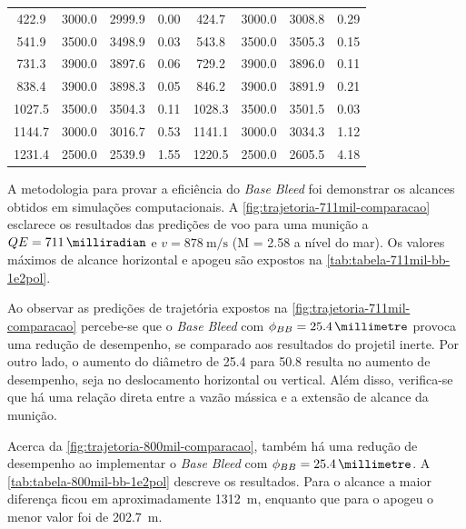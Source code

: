 \begin{table}[ht]
{\begin{tabular}{c|c|c|c|c|c|c|c}
        \num{422,9} & \num{3000,0} & \num{2999,9} & \num{0,00} & \num{424,7} & \num{3000,0} & \num{3008,8} & \num{0,29} \\
        \num{541,9} & \num{3500,0} & \num{3498,9} & \num{0,03} & \num{543,8} & \num{3500,0} & \num{3505,3} & \num{0,15} \\
        \num{731,3} & \num{3900,0} & \num{3897,6} & \num{0,06} & \num{729,2} & \num{3900,0} & \num{3896,0} & \num{0,11} \\
        \num{838,4} & \num{3900,0} & \num{3898,3} & \num{0,05} & \num{846,2} & \num{3900,0} & \num{3891,9} & \num{0,21} \\
        \num{1027,5} & \num{3500,0} & \num{3504,3} & \num{0,11} & \num{1028,3} & \num{3500,0} & \num{3501,5} & \num{0,03} \\
        \num{1144,7} & \num{3000,0} & \num{3016,7} & \num{0,53} & \num{1141,1} & \num{3000,0} & \num{3034,3} & \num{1,12} \\
        \num{1231,4} & \num{2500,0} & \num{2539,9} & \num{1,55} & \num{1220,5} & \num{2500,0} & \num{2605,5} & \num{4,18} \\ 
        \hline
    \end{tabular}%
    }
    \label{tab:tabela-validacao-PRODAS-e-tabela-de-tiro-M107}
\end{table}

A metodologia para provar a eficiência do \textit{Base Bleed} foi demonstrar os alcances obtidos em simulações computacionais. A \autoref{fig:trajetoria-711mil-comparacao} esclarece os resultados das predições de voo para uma munição a \(QE = \qty{711}{\milliradian}\) e \(v = \qty{878}{\metre\per\second}\) (M = \num{2,58} a nível do mar). Os valores máximos de alcance horizontal e apogeu são expostos na  \autoref{tab:tabela-711mil-bb-1e2pol}.

Ao observar as predições de trajetória expostos na \autoref{fig:trajetoria-711mil-comparacao} percebe-se que o \textit{Base Bleed} com \(\phi_{BB} = \qty{25,4}{\millimetre}\) provoca uma redução de desempenho, se comparado aos resultados do projetil inerte. Por outro lado, o aumento do diâmetro de \num{25,4} para \qty{50,8}{\millimetre} resulta no aumento de desempenho, seja no deslocamento horizontal ou vertical. Além disso, verifica-se que há uma relação direta entre a vazão mássica e a extensão de alcance da munição.

Acerca da \autoref{fig:trajetoria-800mil-comparacao}, também há uma redução de desempenho ao implementar o \textit{Base Bleed} com \(\phi_{BB} = \qty{25,4}{\millimetre}\).  A \autoref{tab:tabela-800mil-bb-1e2pol} descreve os resultados. Para o alcance a maior diferença ficou em aproximadamente \qty{1312}{\metre}, enquanto que para o apogeu o menor valor foi de \qty{202,7}{\metre}.

